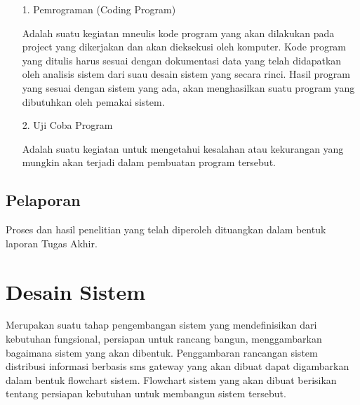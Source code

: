 \documentclass{jtetiproposalskripsi}
\begin{document}
\begin{itemize}

\item[1.]	Pemrograman (Coding Program)

Adalah suatu kegiatan mneulis kode program yang akan dilakukan pada project yang dikerjakan dan akan dieksekusi oleh komputer. Kode program yang ditulis harus sesuai dengan dokumentasi data yang telah didapatkan oleh analisis sistem dari suau desain sistem yang secara rinci. Hasil program yang sesuai dengan sistem yang ada, akan menghasilkan suatu program yang dibutuhkan oleh pemakai sistem.
\item[2.]	Uji Coba Program

Adalah suatu kegiatan untuk mengetahui kesalahan atau kekurangan yang mungkin akan terjadi dalam pembuatan program tersebut.
\end{itemize}

\subsection{Pelaporan}
Proses dan hasil penelitian yang telah diperoleh dituangkan dalam bentuk laporan Tugas Akhir.

\section{Desain Sistem}
Merupakan suatu tahap pengembangan sistem yang mendefinisikan dari kebutuhan fungsional, persiapan untuk rancang bangun, menggambarkan bagaimana sistem yang akan dibentuk. Penggambaran rancangan sistem distribusi informasi berbasis sms gateway yang akan dibuat dapat digambarkan dalam bentuk flowchart sistem. Flowchart sistem yang akan dibuat berisikan tentang persiapan kebutuhan untuk membangun sistem tersebut.
\end{document}
